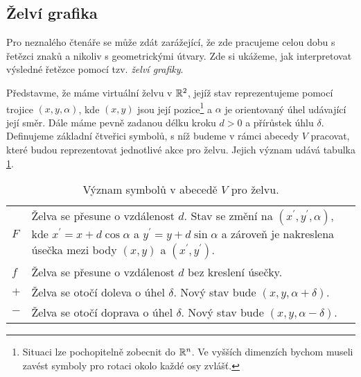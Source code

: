 \subsection{Želví grafika}\label{subsec:zelvi-grafika}

Pro neznalého čtenáře se může zdát zarážející, že zde pracujeme celou dobu s řetězci znaků a nikoliv s geometrickými útvary. Zde si ukážeme, jak interpretovat výsledné řetězce pomocí tzv. \emph{želví grafiky}.

Představme, že máme virtuální želvu v $\mathbb{R}^2$, jejíž stav reprezentujeme pomocí trojice $(x,y,\alpha)$, kde $(x,y)$ jsou její pozice\footnote{Situaci lze pochopitelně zobecnit do $\mathbb{R}^n$. Ve vyšších dimenzích bychom museli zavést symboly pro rotaci okolo každé osy zvlášť.} a $\alpha$ je orientovaný úhel udávající její směr. Dále máme pevně zadanou délku kroku $d>0$ a přírůstek úhlu $\delta$. Definujeme základní čtveřici symbolů, s níž budeme v rámci abecedy $V$ pracovat, které budou reprezentovat jednotlivé akce pro želvu. Jejich význam udává tabulka \ref{table:vyznam-symbolu-zelva}.
\begin{table}[h]
    \centering
    \begin{tabular}{lp{}}
        $F$ & Želva se přesune o vzdálenost $d$. Stav se změní na $(x^\prime,y^\prime,\alpha)$, kde $x^\prime=x+d\cos\alpha$ a $y^\prime=y+d\sin\alpha$ a zároveň je nakreslena úsečka mezi body $(x,y)$ a $(x^\prime,y^\prime)$.\\
        $f$ & Želva se přesune o vzdálenost $d$ bez kreslení úsečky.\\
        $+$ & Želva se otočí doleva o úhel $\delta$. Nový stav bude $(x,y,\alpha+\delta)$.\\
        $-$ & Želva se otočí doprava o úhel $\delta$. Nový stav bude $(x,y,\alpha-\delta)$.
    \end{tabular}
    \caption{Význam symbolů v abecedě $V$ pro želvu.}
    \label{table:vyznam-symbolu-zelva}
\end{table}

